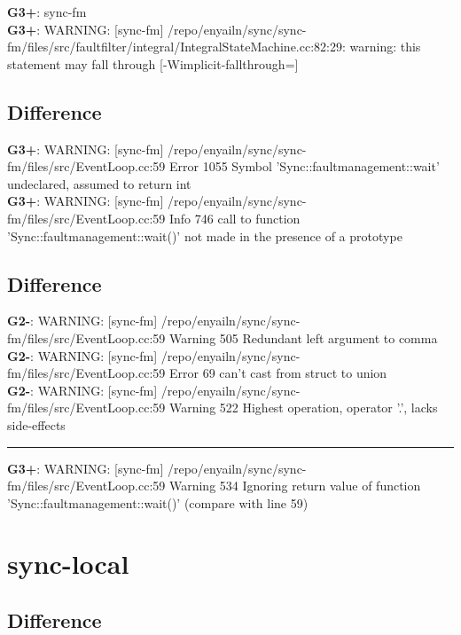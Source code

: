 \documentclass[12pt,twoside]{article}
\begin{document}
\textbf{G3+}: sync-fm\\ 
\textbf{G3+}: WARNING: [sync-fm] /repo/enyailn/sync/sync-fm/files/src/faultfilter/integral/IntegralStateMachine.cc:82:29: warning: this statement may fall through [-Wimplicit-fallthrough=]\\ 
\subsection{Difference} 
\textbf{G3+}: WARNING: [sync-fm] /repo/enyailn/sync/sync-fm/files/src/EventLoop.cc:59 Error 1055 Symbol 'Sync::faultmanagement::wait' undeclared, assumed to return int\\ 
\textbf{G3+}: WARNING: [sync-fm] /repo/enyailn/sync/sync-fm/files/src/EventLoop.cc:59 Info 746 call to function 'Sync::faultmanagement::wait()' not made in the presence of a prototype\\ 
\subsection{Difference} 
\textbf{G2-}: WARNING: [sync-fm] /repo/enyailn/sync/sync-fm/files/src/EventLoop.cc:59 Warning 505 Redundant left argument to comma\\ 
\textbf{G2-}: WARNING: [sync-fm] /repo/enyailn/sync/sync-fm/files/src/EventLoop.cc:59 Error 69 can't cast from struct to union\\ 
\textbf{G2-}: WARNING: [sync-fm] /repo/enyailn/sync/sync-fm/files/src/EventLoop.cc:59 Warning 522 Highest operation, operator '.', lacks side-effects\\ 
\rule{\textwidth}{0.5pt} 
\textbf{G3+}: WARNING: [sync-fm] /repo/enyailn/sync/sync-fm/files/src/EventLoop.cc:59 Warning 534 Ignoring return value of function 'Sync::faultmanagement::wait()' (compare with line 59)\\ 
  
\section{sync-local} 
\subsection{Difference} 
  
\end{document}
